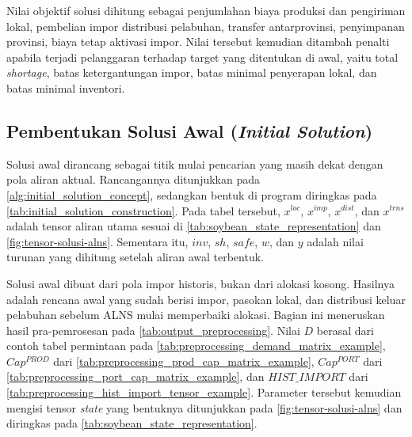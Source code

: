 \documentclass{file/TA-ITS}
\theoremstyle{definition}
\theoremstyle{definition}
\theoremstyle{plain}
\begin{document}
Nilai objektif solusi dihitung sebagai penjumlahan biaya produksi dan pengiriman lokal, pembelian impor distribusi pelabuhan, transfer antarprovinsi, penyimpanan provinsi, biaya tetap aktivasi impor. Nilai tersebut kemudian ditambah penalti apabila terjadi pelanggaran terhadap target yang ditentukan di awal, yaitu total \textit{shortage}, batas ketergantungan impor, batas minimal penyerapan lokal, dan batas minimal inventori.

\subsection{Pembentukan Solusi Awal (\textit{Initial Solution})}

Solusi awal dirancang sebagai titik mulai pencarian yang masih dekat dengan pola aliran aktual. Rancangannya ditunjukkan pada \ref{alg:initial_solution_concept}, sedangkan bentuk di program diringkas pada \ref{tab:initial_solution_construction}. Pada tabel tersebut, \(x^{loc}\), \(x^{imp}\), \(x^{dist}\), dan \(x^{trns}\) adalah tensor aliran utama sesuai di \ref{tab:soybean_state_representation} dan \ref{fig:tensor-solusi-alns}. Sementara itu, \(inv\), \(sh\), \(safe\), \(w\), dan \(y\) adalah nilai turunan yang dihitung setelah aliran awal terbentuk.

Solusi awal dibuat dari pola impor historis, bukan dari alokasi kosong. Hasilnya adalah rencana awal yang sudah berisi impor, pasokan lokal, dan distribusi keluar pelabuhan sebelum ALNS mulai memperbaiki alokasi. Bagian ini meneruskan hasil pra-pemrosesan pada \ref{tab:output_preprocessing}. Nilai \(D\) berasal dari contoh tabel permintaan pada \ref{tab:preprocessing_demand_matrix_example}, \(Cap^{PROD}\) dari \ref{tab:preprocessing_prod_cap_matrix_example}, \(Cap^{PORT}\) dari \ref{tab:preprocessing_port_cap_matrix_example}, dan \(HIST\_IMPORT\) dari \ref{tab:preprocessing_hist_import_tensor_example}. Parameter tersebut kemudian mengisi tensor \textit{state} yang bentuknya ditunjukkan pada \ref{fig:tensor-solusi-alns} dan diringkas pada \ref{tab:soybean_state_representation}.
\end{document}

